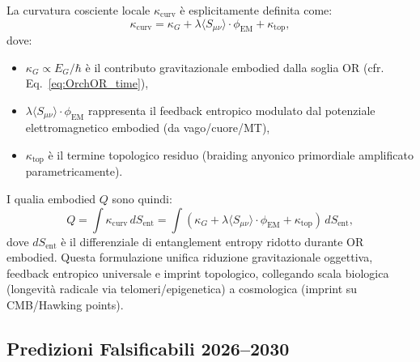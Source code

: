 \documentclass[12pt,a4paper]{article}
\begin{document}
La curvatura cosciente locale $\kappa_{\mathrm{curv}}$ è esplicitamente definita come:
\begin{equation}
\kappa_{\mathrm{curv}} = \kappa_G + \lambda \langle S_{\mu\nu} \rangle \cdot \phi_{\mathrm{EM}} + \kappa_{\mathrm{top}},
\label{eq:kappa_curv_explicit}
\end{equation}
dove:
\begin{itemize}
    \item $\kappa_G \propto E_G / \hbar$ è il contributo gravitazionale embodied dalla soglia OR (cfr. Eq.~\eqref{eq:OrchOR_time}),
    \item $\lambda \langle S_{\mu\nu} \rangle \cdot \phi_{\mathrm{EM}}$ rappresenta il feedback entropico modulato dal potenziale elettromagnetico embodied (da vago/cuore/MT),
    \item $\kappa_{\mathrm{top}}$ è il termine topologico residuo (braiding anyonico primordiale amplificato parametricamente).
\end{itemize}

I qualia embodied $Q$ sono quindi:
\begin{equation}
Q = \int \kappa_{\mathrm{curv}} \, dS_{\mathrm{ent}} = \int \left( \kappa_G + \lambda \langle S_{\mu\nu} \rangle \cdot \phi_{\mathrm{EM}} + \kappa_{\mathrm{top}} \right) \, dS_{\mathrm{ent}},
\label{eq:qualia_embodied}
\end{equation}
dove $dS_{\mathrm{ent}}$ è il differenziale di entanglement entropy ridotto durante OR embodied. Questa formulazione unifica riduzione gravitazionale oggettiva, feedback entropico universale e imprint topologico, collegando scala biologica (longevità radicale via telomeri/epigenetica) a cosmologica (imprint su CMB/Hawking points).

\subsection{Predizioni Falsificabili 2026--2030}
\end{document}
